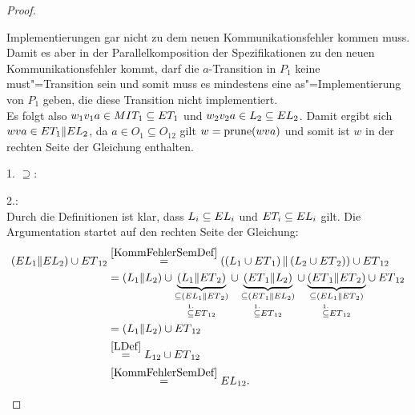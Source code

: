 \begin{proof}
\begin{itemize}
\begin{itemize}
        Implementierungen gar nicht zu dem neuen Kommunikationsfehler kommen
        muss. Damit es aber in der Parallelkomposition der Spezifikationen zu
        den neuen Kommunikationsfehler kommt, darf die $a$-Transition in $P_1$
        keine must"=Transition sein und somit muss es mindestens eine
        as"=Implementierung von $P_1$ geben, die diese Transition nicht
        implementiert.\\
        Es folgt also $w_1v_1a\in MIT _1 \subseteq ET _1$ und $w_2v_2a\in L_2
        \subseteq EL _2$. Damit ergibt sich $wva\in ET _1\|EL_2$, da $a\in
        O_1\subseteq O_{12}$ gilt $w=\mathrm{prune} (wva)$ und somit ist $w$ in der
        rechten Seite der Gleichung enthalten.
    \end{itemize}
  \end{itemize}

  1. \glqq$\supseteq$\grqq{}:\\

  2.:\\
  Durch die Definitionen ist klar, dass $L_i\subseteq EL _i$ und $ET
  _i\subseteq EL _i$ gilt. Die Argumentation startet auf den rechten Seite der
  Gleichung:
  \begin{align*}
    (EL{}_1\| EL{}_2)\cup
    ET{}_{12}&\overset{\ref{KommFehlerSemDef}}{=}\left(\left(L_1\cup
    ET{}_1\right)\|\left(L_2\cup ET{}_2\right)\right)\cup ET{}_{12}\\
    &=(L_1\|L_2) \cup \underset{\overset{1.}{\subseteq}
    ET{}_{12}}{\underset{\subseteq
    (EL{}_1\|ET{}_2)}{\underbrace{(L_1\|ET{}_2)}}} \cup
    \underset{\overset{1.}{\subseteq} ET{}_{12}}{\underset{\subseteq
    (ET{}_1\|EL{}_2)}{\underbrace{(ET{}_1\|L_2)}}} \cup
    \underset{\overset{1.}{\subseteq} ET{}_{12}}{\underset{\subseteq
    (EL{}_1\|ET{}_2)}{\underbrace{(ET{}_1\|ET{}_2)}}} \cup ET{}_{12}\\
    &=(L_1\|L_2) \cup ET{}_{12}\\
    &\overset{\ref{LDef}}{=}L_{12}\cup ET{}_{12}\\
    &\overset{\ref{KommFehlerSemDef}}{=}EL{}_{12}.
  \end{align*}
\end{proof}
